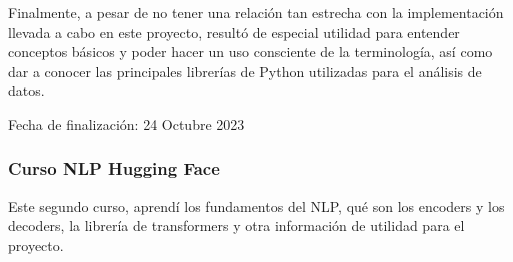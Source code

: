 Finalmente, a pesar de no tener una relación tan estrecha con la implementación llevada a cabo en este proyecto, resultó de especial utilidad para entender conceptos básicos y poder hacer un uso consciente de la terminología, así como dar a conocer las principales librerías de Python utilizadas para el análisis de datos.

\vspace{1.5mm}

Fecha de finalización: 24 Octubre 2023

\vspace{-3.5mm}

\subsubsection*{Curso \gls{NLP} Hugging Face}

\vspace{-0.5mm}

Este segundo curso, aprendí los fundamentos del \gls{NLP}, qué son los encoders y los decoders, la librería de transformers y otra información de utilidad para el proyecto.

